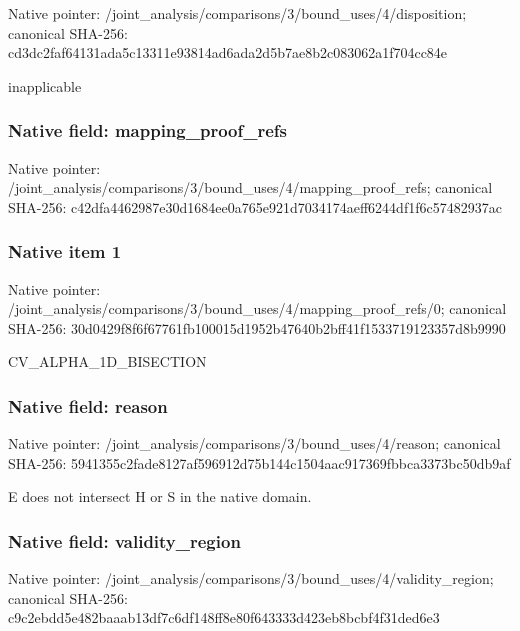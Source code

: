 \documentclass[10pt,a4paper]{article}
\begin{document}
Native pointer: /joint\_analysis/comparis\allowbreak{}ons/3/bound\_uses/4/dispo\allowbreak{}sition; canonical SHA-256: cd3dc2faf64131ada5c13311\allowbreak{}e93814ad6ada2d5b7ae8b2c0\allowbreak{}83062a1f704cc84e


inapplicable


\subsubsection{Native field: mapping\_proof\_refs}


Native pointer: /joint\_analysis/comparis\allowbreak{}ons/3/bound\_uses/4/mappi\allowbreak{}ng\_proof\_refs; canonical SHA-256: c42dfa4462987e30d1684ee0\allowbreak{}a765e921d7034174aeff6244\allowbreak{}df1f6c57482937ac



\subsubsection{Native item 1}


Native pointer: /joint\_analysis/comparis\allowbreak{}ons/3/bound\_uses/4/mappi\allowbreak{}ng\_proof\_refs/0; canonical SHA-256: 30d0429f8f6f67761fb10001\allowbreak{}5d1952b47640b2bff41f1533\allowbreak{}719123357d8b9990


CV\_ALPHA\_1D\_BISECTION


\subsubsection{Native field: reason}


Native pointer: /joint\_analysis/comparis\allowbreak{}ons/3/bound\_uses/4/reaso\allowbreak{}n; canonical SHA-256: 5941355c2fade8127af59691\allowbreak{}2d75b144c1504aac917369fb\allowbreak{}bca3373bc50db9af


E does not intersect H or S in the native domain.


\subsubsection{Native field: validity\_region}


Native pointer: /joint\_analysis/comparis\allowbreak{}ons/3/bound\_uses/4/valid\allowbreak{}ity\_region; canonical SHA-256: c9c2ebdd5e482baaab13df7c\allowbreak{}6df148ff8e80f643333d423e\allowbreak{}b8bcbf4f31ded6e3
\end{document}
